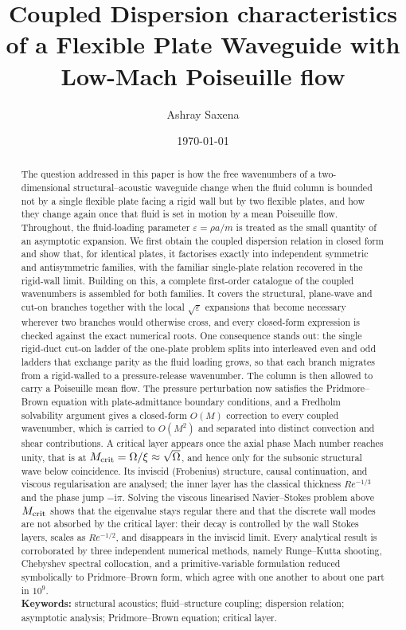 \documentclass[11pt]{article}
\title{\textbf{Coupled Dispersion characteristics of a Flexible Plate
Waveguide with Low-Mach Poiseuille flow}}
\author[1]{Ashray Saxena}
\affil[1]{\small Department of Mechanical Engineering, Birla Institute of Technology \& Science Pilani, Pilani Campus, India}
\date{\today}
\newcommand{\Om}{\Omega}
\newcommand{\eps}{\varepsilon}
\begin{document}
\maketitle

\begin{abstract}
\noindent
The question addressed in this paper is how the free wavenumbers of a two-dimensional
structural--acoustic waveguide change when the fluid column is bounded not by a single flexible plate
facing a rigid wall but by two flexible plates, and how they change again once that fluid is set in
motion by a mean Poiseuille flow. Throughout, the fluid-loading parameter $\eps=\rho a/m$ is treated as the small
quantity of an asymptotic expansion. We first obtain the coupled dispersion relation in closed form and
show that, for identical plates, it factorises exactly into independent symmetric and antisymmetric
families, with the familiar single-plate relation recovered in the rigid-wall limit. Building on this,
a complete first-order catalogue of the coupled wavenumbers is assembled for both families. It covers
the structural, plane-wave and cut-on branches together with the local $\sqrt{\eps}$ expansions that
become necessary wherever two branches would otherwise cross, and every closed-form expression is
checked against the exact numerical roots. One consequence stands out: the single rigid-duct cut-on
ladder of the one-plate problem splits into interleaved even and odd ladders that exchange parity as the
fluid loading grows, so that each branch migrates from a rigid-walled to a pressure-release wavenumber.
The column is then allowed to carry a Poiseuille mean flow. The pressure perturbation now satisfies the
Pridmore--Brown equation with plate-admittance boundary conditions, and a Fredholm solvability argument
gives a closed-form $O(M)$ correction to every coupled wavenumber, which is carried to $O(M^2)$ and
separated into distinct convection and shear contributions. A critical layer appears once the axial
phase Mach number reaches unity, that is at $M_{\rm crit}=\Om/\xi\approx\sqrt{\Om}$, and hence only for
the subsonic structural wave below coincidence. Its inviscid (Frobenius) structure, causal
continuation, and viscous regularisation are analysed; the inner layer has the classical thickness
$Re^{-1/3}$ and the phase jump $-\mathrm{i}\pi$. Solving the viscous linearised Navier--Stokes problem
above $M_{\rm crit}$ shows that the eigenvalue stays regular there and that the discrete wall modes are
not absorbed by the critical layer: their decay is controlled by the wall Stokes layers, scales as
$Re^{-1/2}$, and disappears in the inviscid limit. Every analytical result is corroborated by three
independent numerical methods, namely Runge--Kutta shooting, Chebyshev spectral collocation, and a
primitive-variable formulation reduced symbolically to Pridmore--Brown form, which agree with one
another to about one part in $10^{9}$.
\\[1ex]
\noindent\textbf{Keywords:} structural acoustics; fluid--structure coupling; dispersion relation;
asymptotic analysis; Pridmore--Brown equation; critical layer.
\end{abstract}
\end{document}
